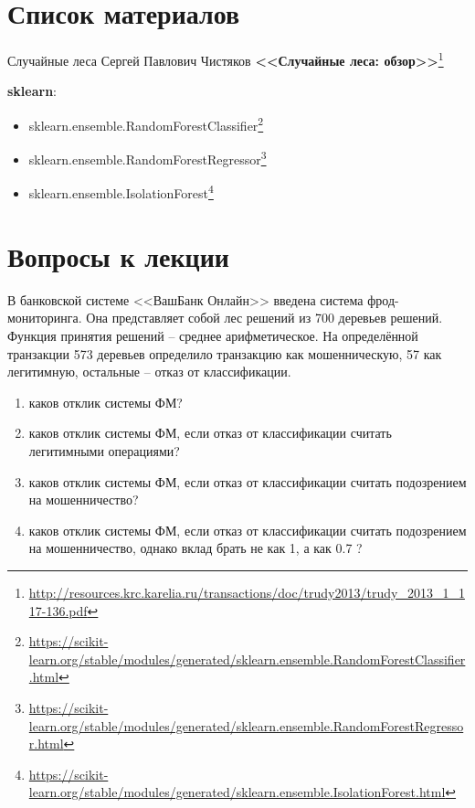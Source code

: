 \documentclass{beamer}
\begin{document}
\section{Список материалов}
  
 
  \begin{frame}{Случайные леса}
  Сергей Павлович Чистяков \textbf{<<Случайные леса: обзор>>}\footnote{\tiny
\url{http://resources.krc.karelia.ru/transactions/doc/trudy2013/trudy_2013_1_117-136.pdf}
}

	\textbf{sklearn}:
	\begin{itemize}
		\item sklearn.ensemble.RandomForestClassifier\footnote{
			\tiny \url{https://scikit-learn.org/stable/modules/generated/sklearn.ensemble.RandomForestClassifier.html}
		}
		\item sklearn.ensemble.RandomForestRegressor\footnote{
			\tiny
			\url{https://scikit-learn.org/stable/modules/generated/sklearn.ensemble.RandomForestRegressor.html}
		}
	    \item sklearn.ensemble.IsolationForest\footnote{
	       \tiny
	       \url{https://scikit-learn.org/stable/modules/generated/sklearn.ensemble.IsolationForest.html}
    	}
	\end{itemize}
  \end{frame}
  
  \section{Вопросы к лекции}
  
  \begin{frame}
  В банковской системе <<ВашБанк Онлайн>> введена система фрод-мониторинга. 
  Она представляет собой лес решений из 700 деревьев решений. Функция принятия решений -- среднее арифметическое. На определённой транзакции 573 деревьев определило транзакцию как мошенническую, 57 как легитимную, остальные -- отказ от классификации.
  \begin{enumerate}
     \item каков отклик системы ФМ?
     \item каков отклик системы ФМ, если отказ от классификации считать легитимными операциями?
     \item каков отклик системы ФМ, если отказ от классификации считать подозрением на мошенничество?
     \item каков отклик системы ФМ, если отказ от классификации считать подозрением на мошенничество, однако вклад брать не как 1, а как 0.7 ?
  \end{enumerate}
  
  \end{frame}
\end{document}
